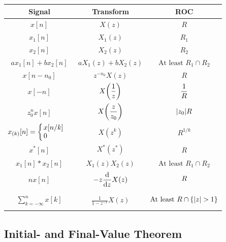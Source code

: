 \documentclass[10pt,UTF8]{article}
\makeatletter
\newenvironment{definition box}
{\begin{tcolorbox}[colback=blue!5!white,colframe=blue!75!black,parbox=false,before upper=\par,before lower=\par]}
{\end{tcolorbox}}
\newenvironment{theorem box}
{\begin{tcolorbox}[colback=yellow!5!white,colframe=yellow!75!black,parbox=false,before upper=\par,before lower=\par]}
{\end{tcolorbox}}
\theoremstyle{definition}
\newtheorem{definition inner}{Definition}[section]
\theoremstyle{plain}
\newtheorem{theorem inner}{Theorem}[section]
\theoremstyle{definition}
\newtheorem*{proof inner}{\textit{Proof}}
\theoremstyle{remark}
\newcommand{\mycases}[2][0.8]{
    \left\{\vphantom{\scalebox{#1}{
        $\begin{matrix}#2\end{matrix}$
    }}\right.\!\!\!\!
    \begin{array}{l@{\quad}l}#2\end{array}
}
\makeatother
\begin{document}
\begin{center}
\begin{tabular}
    { c @{\qquad} c @{\qquad} c}
    Signal & Transform & ROC \\
    \hline $\displaystyle
    x[n]
    $ & $\displaystyle
    X(z)
    $ & $
    R
    $ \\\hline $
    x_1[n]
    $ & $\displaystyle
    X_1(z)
    $ & $
    R_1
    $ \\\hline $
    x_2[n]
    $ & $\displaystyle
    X_2(z)
    $ & $
    R_2
    $ \\\hline $
    a x_1[n] + b x_2[n]
    $ & $\displaystyle
    a X_1(z) + b X_2(z)
    $ & $
    \text{At least } R_1 \cap R_2
    $ \\\hline $
    x[n-n_0]
    $ & $\displaystyle
    z^{-n_0} X(z)
    $ & $
    R
    $ \\\hline $\displaystyle
    x[-n]
    $ & $\displaystyle
    X\qty(\frac{1}{z})
    $ & $\displaystyle
    \frac{1}{R} \vphantom{\mycases{1\\1}}
    $ \\\hline $\displaystyle
    z_0^n x[n]
    $ & $\displaystyle
    X\qty(\frac{z}{z_0})
    $ & $
    \abs{z_0} R \vphantom{\mycases{1\\1}}
    $ \\\hline $\displaystyle
    x_{(k)}[n] = \mycases{
        x[n/k] \\ 0
    }
    $ & $\displaystyle
    X(z^k)
    $ & $
    R^{1/k}
    $ \\\hline $
    x^*[n]
    $ & $\displaystyle
    X^*(z^*)
    $ & $
    R
    $ \\\hline $
    x_1[n] \ast x_2[n]
    $ & $\displaystyle
    X_1(z) X_2(z)
    $ & $
    \text{At least } R_1 \cap R_2
    $ \\\hline $\displaystyle
    n x[n]
    $ & $\displaystyle
    -z \dv{z} X(z)
    $ & $\displaystyle
    R \vphantom{\mycases{1\\1}}
    $ \\\hline $\displaystyle
    \sum_{k=-\infty}^{n} x[k]
    $ & $\displaystyle
    \frac{1}{1-z^{-1}} X(z)
    $ & $\displaystyle
    \text{At least } R \cap \{\abs{z}>1\} \vphantom{\mycases{1\\1}}
    $ \\\hline
\end{tabular}
\end{center}

\subsection{Initial- and Final-Value Theorem}
\end{document}
